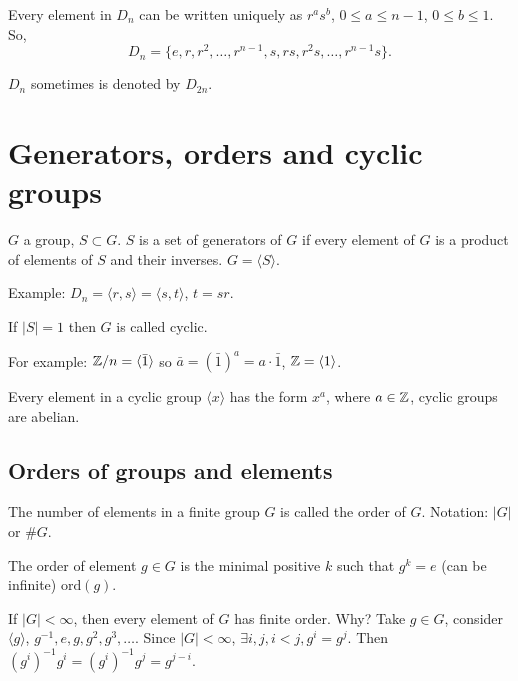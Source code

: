 \documentclass[10pt, a4paper]{article}
\begin{document}
Every element in $D_n$ can be written uniquely as $r ^ as ^ b$,
$0 \leq a \leq n - 1$,
$0 \leq b \leq 1$.
So,
\[
D_n = \{e, r, r ^ 2, \dotsc, r ^ {n - 1}, s, rs, r ^ 2s, \dotsc, r ^ {n - 1}s\}.
\]

\begin{remark}
    $D_n$ sometimes is denoted by $D_{2n}$.
\end{remark}

\newpage

\section{Generators,
orders and cyclic groups}

\begin{definition}
    $G$ a group,
    $S \subset G$.
    $S$ is a set of generators of $G$ if every element of $G$ is a product of elements of $S$ and their inverses.
    $G = \langle S\rangle$.
\end{definition}

Example:
$D_n = \langle r, s\rangle = \langle s, t\rangle$,
$t = sr$.

\begin{definition}
    If $|S| = 1$ then $G$ is called cyclic.
\end{definition}

For example:
$\mathbb{Z} / n = \langle \bar{1}\rangle$ so $\bar{a} = (\bar{1}) ^ a = a \cdot \bar{1}$,
$\mathbb{Z} = \langle 1\rangle$.

Every element in a cyclic group $\langle x\rangle $ has the form $x ^ a$,
where $a \in \mathbb{Z}$,
cyclic groups are abelian.

\subsection{Orders of groups and elements}

\begin{definition}
    The number of elements in a finite group $G$ is called the order of $G$.
    Notation:
    $|G|$ or $\#G$.

    The order of element $g \in G$ is the minimal positive $k$ such that $g ^ k = e$
    (can be infinite)
    $\mathrm{ord}(g)$.
\end{definition}

If $|G| < \infty$,
then every element of $G$ has finite order.
Why?
Take $g \in G$,
consider $\langle g\rangle$,
$g ^ {-1}, e, g, g ^ 2, g ^ 3, \dotsc$.
Since $|G| < \infty$,
$\exists i, j, i < j, g ^ i = g ^ j$.
Then $(g ^ i) ^ {-1}g ^ i = (g ^ i) ^ {-1}g ^ j = g ^ {j - i}$.
\end{document}
